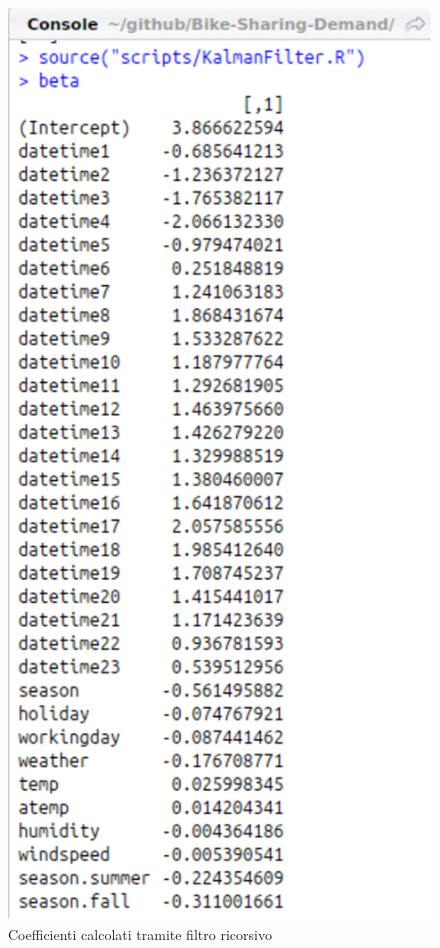 \begin{figure}[H]
  \centering
  \includegraphics[width=.55\columnwidth]{images/lm/kalman-beta.eps}
  \caption{Coefficienti calcolati tramite filtro ricorsivo}
    \label{fig:kalman-beta}
\end{figure}
